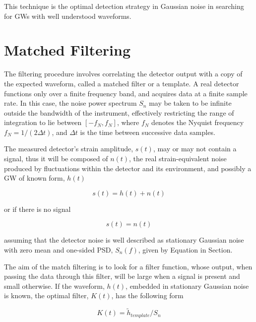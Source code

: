 \documentclass[binding=0.6cm, LaM]{sapthesis}
\begin{document}
	This technique is the optimal detection strategy in Gaussian noise 
	in searching for GWs with well understood waveforms. \cite[p. 2] {bar} \cite[p. 2] {bar}


\section{Matched Filtering}

	The filtering procedure involves correlating the detector output 
	with a copy of the expected waveform, 
	called a matched filter or a template.
	A real detector functions only over a finite frequency band, 
	and acquires data at a finite sample rate. 
	In this case, the noise power spectrum $S_n$ 
	may be taken to be infinite outside the bandwidth of the instrument, 
	effectively restricting the range of integration to lie between $[-f_N, f_N]$, 
	where $f_N$ denotes the Nyquist frequency $f_N = 1/(2\Delta t)$, 
	and $\Delta t$ is the time between successive data samples.   \cite[p. 2] {bar}

	The measured detector’s strain amplitude, $s(t)$, may or may not contain a signal,
	thus it will be composed of $n(t)$, the real strain-equivalent noise
        produced by fluctuations within the detector and its environment, 
	and possibly a GW of known form, $h(t)$
        
                \begin{equation}
                        s(t) = h(t) + n(t)
                \end{equation}
	
	or if there is no signal   		

		\begin{equation}
                        s(t) = n(t)
                \end{equation}
	
        assuming that the detector noise is well described as stationary Gaussian noise with zero mean and one-sided PSD, $S_n(f)$, given by Equation in Section.

        The aim of the match filtering is to look for a filter function,
	whose output, when passing the data through this filter, 
	will be large when a signal is present and small otherwise. 
        If the waveform, $h(t)$, embedded in stationary Gaussian noise is known, 
        the optimal filter, $K(t)$, has the following form

		\begin{equation}
 			K(t) = \tilde h_{template}/S_n
		\end{equation}
\end{document}
